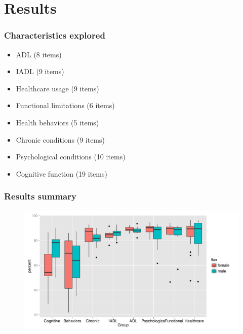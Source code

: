 \documentclass{beamer}
\begin{document}

\section{Results}

\begin{frame}
\frametitle{Characteristics explored}
\begin{itemize}
  \item ADL (8 items)
  \item IADL (9 items)
  \item Healthcare usage (9 items)
  \item Functional limitations (6 items)
  \item Health behaviors (5 items)
  \item Chronic conditions (9 items)
  \item Psychological conditions (10 items)
  \item Cognitive function (19 items)
\end{itemize}
\end{frame}



\begin{frame}
\frametitle{Results summary}
\begin{figure}
\includegraphics[width=.8\linewidth]{Figures/ResultsBoxplot}
\end{figure}
\end{frame}









\end{document}
